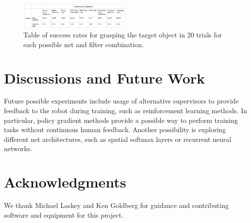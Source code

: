 \documentclass[10pt, conference]{ieeeconf}      %
\begin{document}
\begin{figure}[t]
\centering

\includegraphics[width=0.5\textwidth]{f_figs/results_tables.png}

\caption{\footnotesize Table of success rates for grasping the target object in 20 trials for each possible net and filter combination.}

\label{fig:results_tables}
\end{figure}

\section{Discussions and Future Work}
Future possible experiments include usage of alternative supervisors to provide feedback to the robot during training, such as reinforcement learning methods. In particular, policy gradient methods provide a possible way to perform training tasks without continuous human feedback. Another possibility is exploring different net architectures, such as spatial softmax layers or recurrent neural networks.

\section{Acknowledgments} 
We thank Michael Laskey and Ken Goldberg for guidance and contributing software and equipment for this project. 
  


\end{document}
